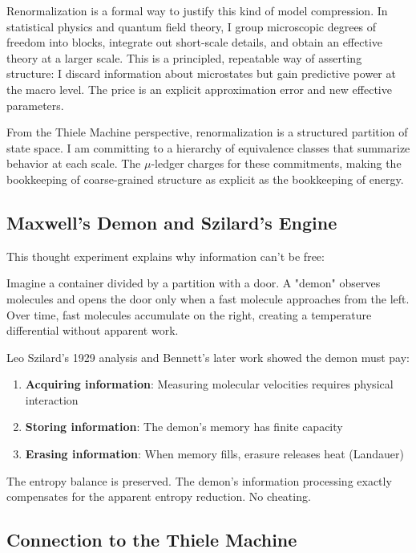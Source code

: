 Renormalization is a formal way to justify this kind of model compression. In statistical physics and quantum field theory, I group microscopic degrees of freedom into blocks, integrate out short-scale details, and obtain an effective theory at a larger scale. This is a principled, repeatable way of asserting structure: I discard information about microstates but gain predictive power at the macro level. The price is an explicit approximation error and new effective parameters.

From the Thiele Machine perspective, renormalization is a structured partition of state space. I am committing to a hierarchy of equivalence classes that summarize behavior at each scale. The $\mu$-ledger charges for these commitments, making the bookkeeping of coarse-grained structure as explicit as the bookkeeping of energy.

\subsection{Maxwell's Demon and Szilard's Engine}

This thought experiment explains why information can't be free:

Imagine a container divided by a partition with a door. A "demon" observes molecules and opens the door only when a fast molecule approaches from the left. Over time, fast molecules accumulate on the right, creating a temperature differential without apparent work.

Leo Szilard's 1929 analysis \cite{szilard1929entropieverminderung} and Bennett's later work showed the demon must pay:
\begin{enumerate}
    \item \textbf{Acquiring information}: Measuring molecular velocities requires physical interaction
    \item \textbf{Storing information}: The demon's memory has finite capacity
    \item \textbf{Erasing information}: When memory fills, erasure releases heat (Landauer)
\end{enumerate}

The entropy balance is preserved. The demon's information processing exactly compensates for the apparent entropy reduction. No cheating.

\subsection{Connection to the Thiele Machine}


